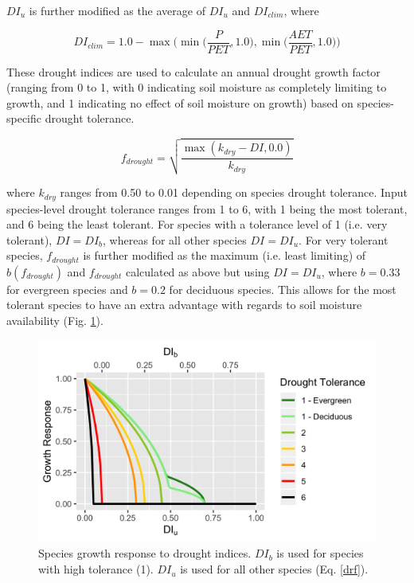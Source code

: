\documentclass[a4paper, 12pt] {report}
\begin{document}
$DI_u$ is further modified as the average of $DI_u$ and $DI_{clim}$, where 

\begin{equation}
DI_{clim} = 1.0 -  \max\Bigg(\min\Big(\frac{P}{PET}, 1.0\Big), \min\Big(\frac{AET}{PET}, 1.0\Big)\Bigg)
\end{equation}

These drought indices are used to calculate an annual drought growth factor (ranging from 0 to 1, with 0 indicating soil moisture as completely limiting to growth, and 1 indicating no effect of soil moisture on growth) based on species-specific drought tolerance. 

\begin{equation} \label{drf}
f_{drought} = \sqrt{\frac{ \max(k_{dry} - DI, 0.0)}{k_{dry}}}
\end{equation}

where $k_{dry}$ ranges from 0.50 to 0.01 depending on species drought tolerance. Input species-level drought tolerance ranges from 1 to 6, with 1 being the most tolerant, and 6 being the least tolerant. For species with a tolerance level of 1 (i.e. very tolerant), $DI = DI_b$, whereas for all other species $DI = DI_u$. For very tolerant species, $f_{drought}$ is further modified as the maximum (i.e. least limiting) of $b(f_{drought})$ and $f_{drought}$ calculated as above but using $DI = DI_u$, where $b = 0.33$ for evergreen species and $b = 0.2$ for deciduous species. This allows for the most tolerant species to have an extra advantage with regards to soil moisture availability (Fig. \ref{fig:drought}).

\begin{figure}
  \includegraphics[width=0.9\linewidth]{Figures/drought.png}
  \caption{Species growth response to drought indices. $DI_b$ is used for species with high tolerance (1). $DI_u$ is used for all other species (Eq. \ref{drf}).}
  \label{fig:drought}
\end{figure}
\end{document}
